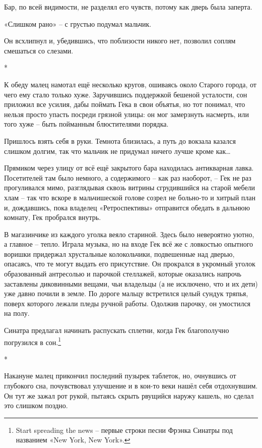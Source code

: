 \documentclass[
  a5paperpaper,
  DIV=11,
  numbers=noendperiod]{scrreprt}
\begin{document}
Бар, по всей видимости, не разделял его чувств, потому как дверь была
заперта.

«Слишком рано» -- с грустью подумал мальчик.

Он всхлипнул и, убедившись, что поблизости никого нет, позволил соплям
смешаться со слезами.

*

К обеду малец намотал ещё несколько кругов, ошиваясь около Старого
города, от чего ему стало только хуже. Заручившись поддержкой бешеной
усталости, сон приложил все усилия, дабы поймать Гека в свои объятья, но
тот понимал, что нельзя просто упасть посреди грязной улицы: он мог
замерзнуть насмерть, или того хуже -- быть пойманным блюстителями
порядка.

Пришлось взять себя в руки. Темнота близилась, а путь до вокзала казался
слишком долгим, так что мальчик не придумал ничего лучше кроме
как\ldots{}

Прямиком через улицу от всё ещё закрытого бара находилась антикварная
лавка. Посетителей там было немного, а содержимого -- как раз наоборот,
-- Гек не раз прогуливался мимо, разглядывая сквозь витрины сгрудившийся
на старой мебели хлам -- так что вскоре в мальчишеской голове созрел не
больно-то и хитрый план и, дождавшись, пока владелец «Ретроспективы»
отправится обедать в дальнюю комнату, Гек пробрался внутрь.

В магазинчике из каждого уголка веяло стариной. Здесь было невероятно
уютно, а главное -- тепло. Играла музыка, но на входе Гек всё же с
ловкостью опытного воришки придержал хрустальные колокольчики,
подвешенные над дверью, опасаясь, что те могут выдать его присутствие.
Он прокрался в укромный уголок образованный антресолью и парочкой
стеллажей, которые оказались напрочь заставлены диковинными вещами, чьи
владельцы (а не исключено, что и их дети) уже давно почили в земле. По
дороге мальцу встретился целый сундук тряпья, поверх которого лежали
пледы ручной работы. Одолжив парочку, он умостился на полу.

Синатра предлагал начинать распускать сплетни, когда Гек благополучно
погрузился в сон.\footnote{Start spreading the news -- первые строки
  песни Фрэнка Синатры под названием «New York, New York».}

*

Накануне малец прикончил последний пузырек таблеток, но, очнувшись от
глубокого сна, почувствовал улучшение и в кои-то веки нашёл себя
отдохнувшим. Он тут же зажал рот рукой, пытаясь скрыть рвущийся наружу
кашель, но сделал это слишком поздно.
\end{document}
